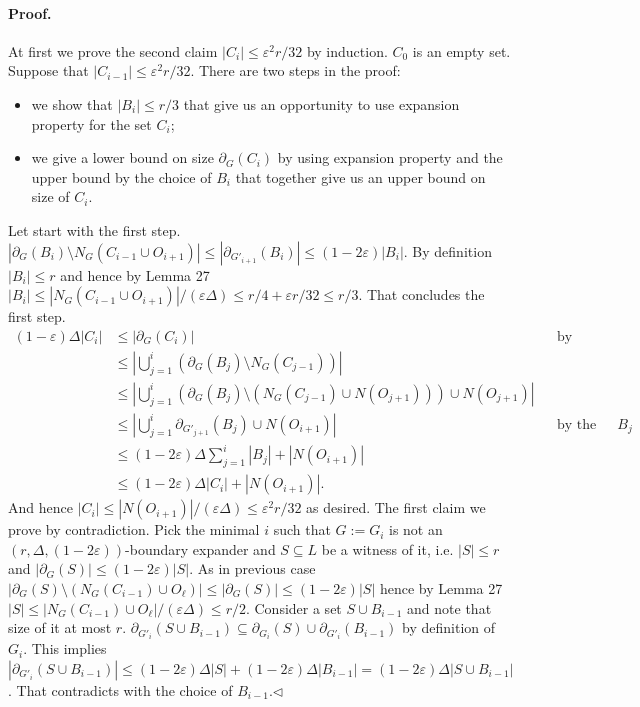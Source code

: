 \paragraph{Proof.} At first we prove the second claim $|C_i|\leq\varepsilon^2r/32$ by induction. $C_0$ is an empty set. Suppose that $|C_{i-1}|\leq\varepsilon^2r/32$. There are two steps in the proof:
\begin{itemize}
\item we show that $|B_i|\leq r/3$ that give us an opportunity to use expansion property for the set $C_i$;
\item we give a lower bound on size $\partial_G(C_i)$ by using expansion property and the upper bound by the choice of $B_i$ that together give us an upper bound on size of $C_i$.
\end{itemize}
Let start with the first step. $|\partial_G(B_i)\setminus N_G(C_{i-1}\cup O_{i+1})|\leq|\partial_{G'_{i+1}}(B_i)|\leq(1-2\varepsilon)|B_i|$. By definition $|B_i|\leq r$ and hence by Lemma 27 $|B_i|\leq|N_G(C_{i-1}\cup O_{i+1})|/(\varepsilon\Delta)\leq r/4+\varepsilon r/32\leq r/3$. That concludes the first step.
\begin{align*}
(1-\varepsilon)\Delta|C_i|&\leq|\partial_G(C_i)|&&\text{by expansion}\\
&\leq\left|\bigcup_{j=1}^i(\partial_G(B_j)\setminus N_G(C_{j-1}))\right|\\
&\leq\left|\bigcup_{j=1}^i(\partial_G(B_j)\setminus(N_G(C_{j-1})\cup N(O_{j+1})))\cup N(O_{j+1})\right|\\
&\leq\left|\bigcup_{j=1}^i\partial_{G'_{j+1}}(B_j)\cup N(O_{i+1})\right|&&\text{by the choice of }B_j\\
&\leq(1-2\varepsilon)\Delta\sum_{j=1}^i|B_j|+|N(O_{i+1})|\\
&\leq(1-2\varepsilon)\Delta|C_i|+|N(O_{i+1})|.
\end{align*}
And hence $|C_i|\leq|N(O_{i+1})|/(\varepsilon\Delta)\leq\varepsilon^2r/32$ as desired.
The first claim we prove by contradiction. Pick the minimal $i$ such that $G:=G_i$ is not an $(r,\Delta,(1-2\varepsilon))$-boundary expander and $S\subseteq L$ be a witness of it, i.e. $|S|\leq r$ and $|\partial_G(S)|\leq(1-2\varepsilon)|S|$. As in previous case $|\partial_G(S)\setminus(N_G(C_{i-1})\cup O_\ell)|\leq|\partial_G(S)|\leq(1-2\varepsilon)|S|$ hence by Lemma 27 $|S|\leq|N_G(C_{i-1})\cup O_\ell|/(\varepsilon\Delta)\leq r/2$.
Consider a set $S\cup B_{i-1}$ and note that size of it at most $r$. $\partial_{G'_i}(S\cup B_{i-1})\subseteq\partial_{G_i}(S)\cup\partial_{G'_i}(B_{i-1})$ by definition of $G_i$. This implies $|\partial_{G'_i}(S\cup B_{i-1})|\leq(1-2\varepsilon)\Delta|S|+(1-2\varepsilon)\Delta|B_{i-1}|=(1-2\varepsilon)\Delta|S\cup B_{i-1}|$. That contradicts with the choice of $B_{i-1}$.\hfill$\triangleleft$
